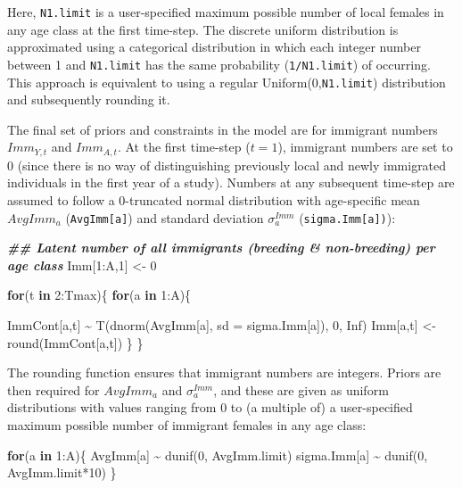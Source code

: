 \documentclass[
]{book}
\newenvironment{Shaded}{\begin{snugshade}}{\end{snugshade}}
\newcommand{\AttributeTok}[1]{\textcolor[rgb]{0.77,0.63,0.00}{#1}}
\newcommand{\ConstantTok}[1]{\textcolor[rgb]{0.00,0.00,0.00}{#1}}
\newcommand{\ControlFlowTok}[1]{\textcolor[rgb]{0.13,0.29,0.53}{\textbf{#1}}}
\newcommand{\DecValTok}[1]{\textcolor[rgb]{0.00,0.00,0.81}{#1}}
\newcommand{\DocumentationTok}[1]{\textcolor[rgb]{0.56,0.35,0.01}{\textbf{\textit{#1}}}}
\newcommand{\FunctionTok}[1]{\textcolor[rgb]{0.00,0.00,0.00}{#1}}
\newcommand{\NormalTok}[1]{#1}
\newcommand{\OtherTok}[1]{\textcolor[rgb]{0.56,0.35,0.01}{#1}}
\newcommand{\SpecialCharTok}[1]{\textcolor[rgb]{0.00,0.00,0.00}{#1}}
\begin{document}
Here, \texttt{N1.limit} is a user-specified maximum possible number of local females in
any age class at the first time-step. The discrete uniform distribution is
approximated using a categorical distribution in which each integer number between
1 and \texttt{N1.limit} has the same probability (\texttt{1/N1.limit}) of occurring.
This approach is equivalent to using a regular Uniform(0,\texttt{N1.limit}) distribution
and subsequently rounding it.

The final set of priors and constraints in the model are for immigrant numbers
\(Imm_{Y,t}\) and \(Imm_{A,t}\). At the first time-step (\(t=1\)), immigrant numbers
are set to 0 (since there is no way of distinguishing previously local and
newly immigrated individuals in the first year of a study). Numbers at any
subsequent time-step are assumed to follow a 0-truncated normal distribution
with age-specific mean \(AvgImm_a\) (\texttt{AvgImm{[}a{]}}) and standard deviation
\(\sigma_a^{Imm}\) (\texttt{sigma.Imm{[}a{]})}):

\begin{Shaded}
\begin{Highlighting}[]
\DocumentationTok{\#\# Latent number of all immigrants (breeding \& non{-}breeding) per age class}
\NormalTok{Imm[}\DecValTok{1}\SpecialCharTok{:}\NormalTok{A,}\DecValTok{1}\NormalTok{] }\OtherTok{\textless{}{-}} \DecValTok{0}

\ControlFlowTok{for}\NormalTok{(t }\ControlFlowTok{in} \DecValTok{2}\SpecialCharTok{:}\NormalTok{Tmax)\{}
  \ControlFlowTok{for}\NormalTok{(a }\ControlFlowTok{in} \DecValTok{1}\SpecialCharTok{:}\NormalTok{A)\{}

\NormalTok{    ImmCont[a,t] }\SpecialCharTok{\textasciitilde{}} \FunctionTok{T}\NormalTok{(}\FunctionTok{dnorm}\NormalTok{(AvgImm[a], }\AttributeTok{sd =}\NormalTok{ sigma.Imm[a]), }\DecValTok{0}\NormalTok{, }\ConstantTok{Inf}\NormalTok{)}
\NormalTok{    Imm[a,t] }\OtherTok{\textless{}{-}} \FunctionTok{round}\NormalTok{(ImmCont[a,t])}
\NormalTok{  \}}
\NormalTok{\}}
\end{Highlighting}
\end{Shaded}

The rounding function ensures that immigrant numbers are integers.
Priors are then required for \(AvgImm_a\) and \(\sigma_a^{Imm}\), and these are
given as uniform distributions with values ranging from 0 to (a multiple of) a
user-specified maximum possible number of immigrant females in any age class:

\begin{Shaded}
\begin{Highlighting}[]
\ControlFlowTok{for}\NormalTok{(a }\ControlFlowTok{in} \DecValTok{1}\SpecialCharTok{:}\NormalTok{A)\{}
\NormalTok{  AvgImm[a] }\SpecialCharTok{\textasciitilde{}} \FunctionTok{dunif}\NormalTok{(}\DecValTok{0}\NormalTok{, AvgImm.limit)}
\NormalTok{  sigma.Imm[a] }\SpecialCharTok{\textasciitilde{}} \FunctionTok{dunif}\NormalTok{(}\DecValTok{0}\NormalTok{, AvgImm.limit}\SpecialCharTok{*}\DecValTok{10}\NormalTok{)}
\NormalTok{\}}
\end{Highlighting}
\end{Shaded}
\end{document}
